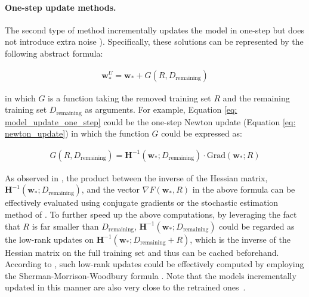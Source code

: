 \documentclass[11pt]{article}
\newcommand{\uw}{\textbf{w}^{U}}
\newcommand{\w}{\textbf{w}}
\newcommand{\bH}{\textbf{H}}
\begin{document}
\paragraph{One-step update methods.}
The second type of method incrementally updates the model in one-step but does not introduce extra noise \cite{golatkar2020forgetting,izzo2021approximate}).
Specifically, these solutions can be represented by the following abstract formula:
\begin{small}
\begin{align}\label{eq: model_update_one_step}
\uw_* = \w_* + G(R, D_{\text{remaining}})
\end{align}
\end{small}
\noindent
in which $G$ is a function taking the removed training set $R$ and the remaining training set $D_{\text{remaining}}$ as arguments. For example, 
Equation \eqref{eq: model_update_one_step} could be the one-step Newton update (Equation \eqref{eq: newton_update}) in which 
the function $G$ could be expressed as:
\begin{small}
\begin{align*}
    G(R, D_{\text{remaining}}) = \bH^{-1}(\w_*; D_{\text{remaining}})\cdot\text{Grad}(\w_*; R)
\end{align*}
\end{small}


As observed in \cite{koh2017understanding}, 
the product between the inverse of the Hessian matrix, $\bH^{-1}(\w_*; D_{\text{remaining}})$, and the vector $\nabla F(\w_*, R)$ in the above formula can be effectively evaluated using conjugate gradients \cite{martens2010deep} or the stochastic estimation method of \cite{agarwal2016second}. To further speed up the above computations, by leveraging the fact that $R$ is far smaller than $D_{\text{remaining}}$,  $\bH^{-1}(\w_*; D_{\text{remaining}})$ could be regarded as the low-rank updates on $\bH^{-1}(\w_*; D_{\text{remaining}} + R)$, which is the inverse of the Hessian matrix on the full training set and thus can be cached beforehand. According to \cite{izzo2021approximate}, such low-rank updates could be effectively computed by employing the Sherman-Morrison-Woodbury formula \cite{sherman1950adjustment}. 
Note that the models incrementally updated in this manner are also very close to the retrained ones~\cite{koh2017understanding}. %
\end{document}
